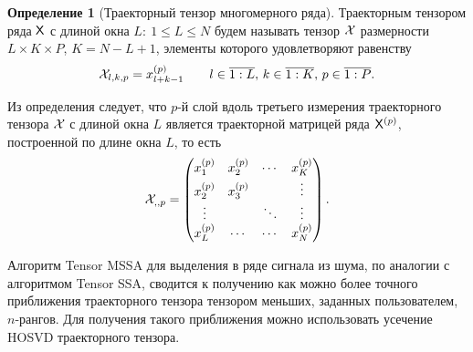 \documentclass[specialist,
    substylefile = spbu_report.rtx,
    subf,href,colorlinks=true, 12pt]{disser}
\theoremstyle{plain}
\theoremstyle{definition}
\newtheorem{definition}{Определение}[section]
\theoremstyle{remark}
\begin{document}
    \begin{definition}[Траекторный тензор многомерного ряда]
        Траекторным тензором ряда $\mathsf{X}$ с длиной окна $L:\: 1\leqslant L \leqslant N$ будем называть тензор $\mathcal{X}$
        размерности ${L \times K \times P}$, ${K = N - L + 1}$, элементы которого удовлетворяют равенству
        \[
            \mathcal{X}_{l,k,p}=x_{l+k-1}^{(p)} \qquad l \in \overline{1:L},\, k \in \overline{1:K},\, p \in \overline{1:P}.
        \]\label{def:trajectory-tensor-mssa}
    \end{definition}

    Из определения следует, что $p$-й слой вдоль третьего измерения траекторного тензора $\mathcal{X}$ с длиной окна $L$
    является траекторной матрицей ряда $\mathsf{X}^{(p)}$, построенной по длине окна $L$, то есть
    \[
        \mathcal{X}_{,,p} =
        \begin{pmatrix}
            x_1^{(p)} & x_2^{(p)} & \cdots & x_K^{(p)} \\
            x_2^{(p)} & x_3^{(p)} &        & \vdots    \\
            \vdots    &           & \ddots & \vdots    \\
            x_L^{(p)} & \cdots    & \cdots & x_N^{(p)}
        \end{pmatrix}.
    \]

    Алгоритм Tensor MSSA для выделения в ряде сигнала из шума, по аналогии с алгоритмом Tensor SSA,
    сводится к получению как можно более точного приближения траекторного тензора тензором меньших,
    заданных пользователем, $n$-рангов.
    Для получения такого приближения можно использовать усечение HOSVD траекторного тензора.
\end{document}
